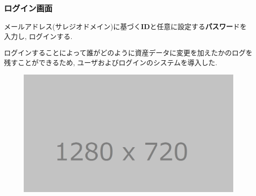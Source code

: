 \documentclass[11ptm]{jsarticle}
\begin{document}
\subsubsection{ログイン画面}
\label{sec:ログイン画面}
メールアドレス(サレジオドメイン)に基づく{\bf ID}と任意に設定する{\bf パスワー}ドを入力し, ログインする. \par
ログインすることによって誰がどのように資産データに変更を加えたかのログを残すことができるため, ユーザおよびログインのシステムを導入した.
\begin{figure}[h]
  \centering
  \includegraphics[keepaspectratio, width=0.8\linewidth]{source/tmp_picture.png}
  \caption{\label{fig:}}
\end{figure}

\clearpage
\end{document}
